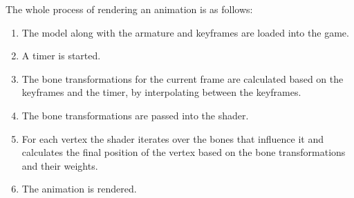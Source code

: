 The whole process of rendering an animation is as follows:
\begin{enumerate}
    \item The model along with the armature and keyframes are loaded into the game.
    \item A timer is started.
    \item The bone transformations for the current frame are calculated based on the keyframes and the timer, by interpolating between the keyframes.
    \item The bone transformations are passed into the shader.
    \item For each vertex the shader iterates over the bones that influence it and calculates the final position of the vertex based on the bone transformations and their weights.
    \item The animation is rendered.
\end{enumerate}